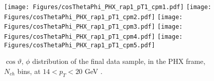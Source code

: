\documentclass[12pt]{article}
\newcommand{\pt}{$p_{\mathrm{T}}$}
\begin{document}
%
%


\begin{figure}[htbp]
\centering
\texttt{[image: Figures/cosThetaPhi\_PHX\_rap1\_pT1\_cpm1.pdf]}
\texttt{[image: Figures/cosThetaPhi\_PHX\_rap1\_pT1\_cpm2.pdf]}
\texttt{[image: Figures/cosThetaPhi\_PHX\_rap1\_pT1\_cpm3.pdf]}
\texttt{[image: Figures/cosThetaPhi\_PHX\_rap1\_pT1\_cpm4.pdf]}
\texttt{[image: Figures/cosThetaPhi\_PHX\_rap1\_pT1\_cpm5.pdf]}
\caption{$\cos\vartheta,\,\phi$ distribution of the final data sample, 
	in the PHX frame, $N_{ch}$ bins, at $14 < p_{T} < 20$ GeV .}
\end{figure}
\clearpage
\end{document}
